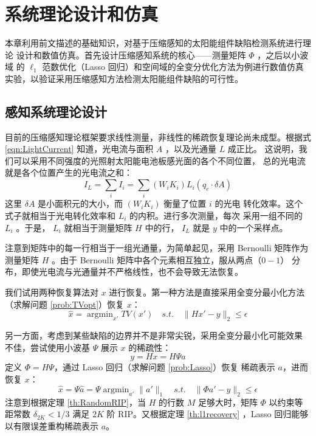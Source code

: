 \chapter{系统理论设计和仿真}

本章利用前文描述的基础知识，对基于压缩感知的太阳能组件缺陷检测系统进行理论
设计和数值仿真。首先设计压缩感知系统的核心——测量矩阵 $\Phi$ ，之后以小波域
的 $\ell_1$ 范数优化（Lasso 回归）和空间域的全变分优化方法为例进行数值仿真
实验，以验证采用压缩感知方法检测太阳能组件缺陷的可行性。

\section{感知系统理论设计}

目前的压缩感知理论框架要求线性测量，非线性的稀疏恢复理论尚未成型。根据式
\ref{eqn:LightCurrent} 知道，光电流与面积 $A$ ，以及光通量 $L$ 成正比。
这说明，我们可以采用不同强度的光照射太阳能电池板感光面的各个不同位置，
总的光电流就是各个位置产生的光电流之和：
\begin{equation}
I_L = \sum_i I_i = \sum_i (W_i K_i)  L_i(q_e \cdot \delta A)
\end{equation}
这里 $\delta A$ 是小面积元的大小，而 $(W_i K_i)$ 衡量了位置 $i$ 的光电
转化效率。这个式子就相当于光电转化效率和 $L_i$ 的内积。进行多次测量，每次
采用一组不同的 $L_i$ 。于是， $L_i$ 就相当于测量矩阵 $H$ 中的行，
$I_L$ 就是 $y$ 中的一个采样点。

注意到矩阵中的每一行相当于一组光通量，为简单起见，采用 Bernoulli 矩阵作为
测量矩阵 $H$ 。由于 Bernoulli 矩阵中各个元素相互独立，服从两点（$0-1$）
分布，即使光电流与光通量并不严格线性，也不会导致无法恢复。

我们试用两种恢复算法对 $x$ 进行恢复。第一种方法是直接采用全变分最小化方法
（求解问题 \ref{prob:TVopt}）恢复 $x$：
\begin{equation}
\hat x = \mathop{\arg\min}_{x'} TV(x') \quad s.t. \quad
\|Hx' - y\|_2 \leq \epsilon
\end{equation}

另一方面，考虑到某些缺陷的边界并不是非常尖锐，采用全变分最小化可能效果
不佳，尝试使用小波基 $\Psi$ 展示 $x$ 的稀疏性：
\begin{equation}
y = Hx = H\Psi a
\end{equation}
定义 $\Phi = H\Psi$，通过 Lasso 回归（求解问题 \ref{prob:Lasso}）恢复
稀疏表示 $a$，进而恢复 $x$：
\begin{equation}
\hat x = \Psi \hat a = \Psi \mathop{\arg\min}_{a'} \|a'\|_1 \quad s.t.
\quad \|\Phi a' - y\|_2 \leq \epsilon
\end{equation}
注意到根据定理 \ref{th:RandomRIP}，当 $H$ 的行数 $M$ 足够大时，矩阵 $\Phi$
以约束等距常数 $\delta_{2K} < 1/3$ 满足 $2K$ 阶 RIP。又根据定理
\ref{th:l1recovery} ，Lasso 回归能够以有限误差重构稀疏表示 $a$。

